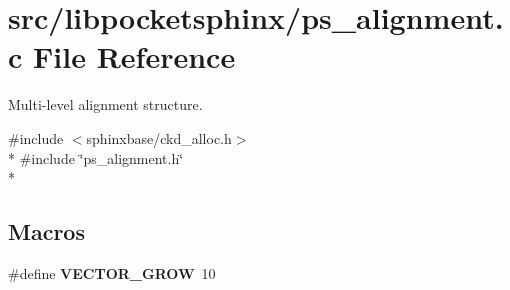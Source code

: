 \section{src/libpocketsphinx/ps\-\_\-alignment.c File Reference}
\label{ps__alignment_8c}


Multi-\/level alignment structure.  


{\ttfamily \#include $<$sphinxbase/ckd\-\_\-alloc.\-h$>$}\\*
{\ttfamily \#include \char`\"{}ps\-\_\-alignment.\-h\char`\"{}}\\*
\subsection*{Macros}
\begin{DoxyCompactItemize}
\item 
\#define {\bfseries V\-E\-C\-T\-O\-R\-\_\-\-G\-R\-O\-W}~10\label{ps__alignment_8c_af4a1705d5cc1103ccf95a9b5401d4c6e}

\end{DoxyCompactItemize}
